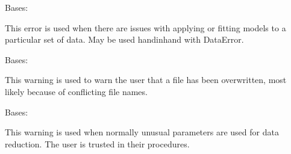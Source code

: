 \documentclass[letterpaper,10pt,english]{sphinxmanual}
\begin{document}

\begin{fulllineitems}
\label{\detokenize{docstrings/ifa_smeargle.core.error:ifa_smeargle.core.error.ModelingError}}
Bases: {\hyperref[\detokenize{docstrings/ifa_smeargle.core.error:ifa_smeargle.core.error.Ifas_Exception}]{}}

This error is used when there are issues with applying or
fitting models to a particular set of data. May be used
hand\sphinxhyphen{}in\sphinxhyphen{}hand with DataError.

\end{fulllineitems}


\begin{fulllineitems}
\label{\detokenize{docstrings/ifa_smeargle.core.error:ifa_smeargle.core.error.OverwriteWarning}}
Bases: {\hyperref[\detokenize{docstrings/ifa_smeargle.core.error:ifa_smeargle.core.error.Ifas_Warning}]{}}

This warning is used to warn the user that a file has been
overwritten, most likely because of conflicting file names.

\end{fulllineitems}


\begin{fulllineitems}
\label{\detokenize{docstrings/ifa_smeargle.core.error:ifa_smeargle.core.error.ReductionWarning}}
Bases: {\hyperref[\detokenize{docstrings/ifa_smeargle.core.error:ifa_smeargle.core.error.Ifas_Warning}]{}}

This warning is used when normally unusual parameters are
used for data reduction. The user is trusted in their procedures.

\end{fulllineitems}
\end{document}
